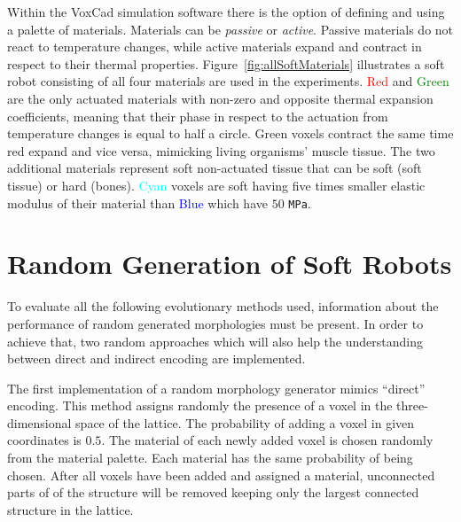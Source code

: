 Within the VoxCad simulation software there is the option of defining and using a palette of materials. Materials can be \emph{passive} or \emph{active}. Passive materials do not react to temperature changes, while active materials expand and contract in respect to their thermal properties. Figure~\ref{fig:allSoftMaterials} illustrates a soft robot consisting of all four materials are used in the experiments. \textcolor{Red}{Red} and \textcolor{Green}{Green} are the only actuated materials with non-zero and opposite thermal expansion coefficients, meaning that their phase in respect to the actuation from temperature changes is equal to half a circle. Green voxels contract the same time red expand and vice versa, mimicking living organisms' muscle tissue. The two additional materials represent soft non-actuated tissue that can be soft (soft tissue) or hard (bones). \textcolor{Cyan}{Cyan} voxels are soft having five times smaller elastic modulus of their material than \textcolor{Blue}{Blue} which have $50$ \texttt{MPa}.


\section{Random Generation of Soft Robots}

To evaluate all the following evolutionary methods used, information about the performance of random generated morphologies must be present. In order to achieve that, two random approaches which will also help the understanding between direct and indirect encoding are implemented. 

The first implementation of a random morphology generator mimics ``direct'' encoding. This method assigns randomly the presence of a voxel in the three-dimensional space of the lattice. The probability of adding a voxel in given coordinates is $0.5$. The material of each newly added voxel is chosen randomly from the material palette. Each material has the same probability of being chosen. After all voxels have been added and assigned a material, unconnected parts of of the structure will be removed keeping only the largest connected structure in the lattice.


